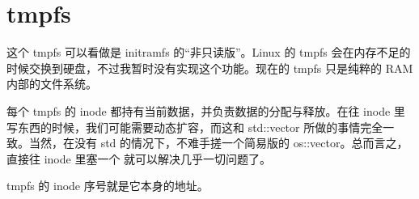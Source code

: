 \section{tmpfs}
\label{sec:tmpfs}

这个 tmpfs 可以看做是 initramfs 的“非只读版”。Linux 的 tmpfs 会在内存不足的时候交换到硬盘，不过我暂时没有实现这个功能。现在的 tmpfs 只是纯粹的 RAM 内部的文件系统。

每个 tmpfs 的 inode 都持有当前数据，并负责数据的分配与释放。在往 inode 里写东西的时候，我们可能需要动态扩容，而这和 std::vector 所做的事情完全一致。当然，在没有 std 的情况下，不难手搓一个简易版的 os::vector。总而言之，直接往 inode 里塞一个  就可以解决几乎一切问题了。

tmpfs 的 inode 序号就是它本身的地址。
